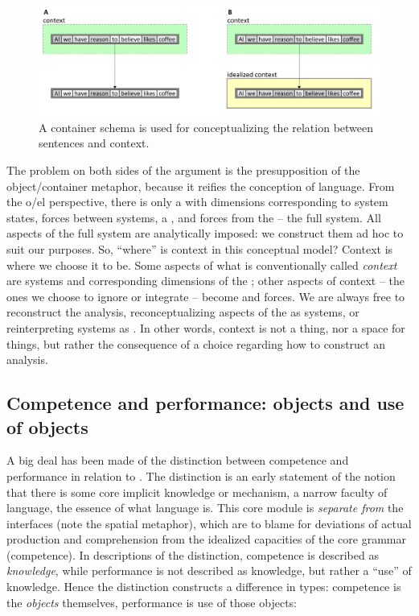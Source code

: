   
\begin{figure}
\includegraphics[width=\textwidth]{figures/Tilsen-img120.png}
\caption{A container schema is used for conceptualizing the relation between sentences and context.}
\label{fig:6:1}
\end{figure}
 

  The problem on both sides of the argument is the presupposition of the object/container metaphor, because it reifies the  conception of language. From the o/el perspective, there is only a  with dimensions corresponding to system states, forces between systems, a , and forces from the  -- the full system. All aspects of the full system are analytically imposed: we construct them ad hoc to suit our purposes. So, “where” is context in this conceptual model? Context is where we choose it to be. Some aspects of what is conventionally called \textit{context} are systems and corresponding dimensions of the ; other aspects of context -- the ones we choose to ignore or integrate -- become  and  forces. We are always free to reconstruct the analysis, reconceptualizing aspects of the  as systems, or reinterpreting systems as . In other words, context is not a thing, nor a space for things, but rather the consequence of a choice regarding how to construct an analysis.

\subsection{Competence and performance: objects and use of objects}

A big deal has been made of the distinction between competence and performance in relation to  \citep{Chomsky1965}. The distinction is an early statement of the notion that there is some core implicit knowledge or mechanism, a narrow faculty of language, the essence of what language is. This core module is \textit{separate from} the  interfaces (note the spatial metaphor), which are to blame for deviations of actual production and comprehension from the idealized capacities of the core grammar (competence). In descriptions of the distinction, competence is described as \textit{knowledge}, while performance is not described as knowledge, but rather a “use” of knowledge. Hence the distinction constructs a difference in types: competence is the \textit{objects} themselves, performance is use of those objects:

